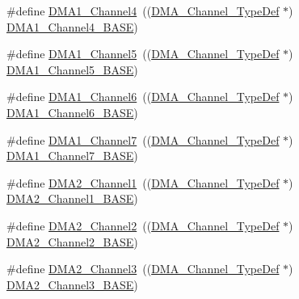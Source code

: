\begin{DoxyCompactItemize}
\item 
\#define \hyperlink{group___peripheral__declaration_gad2c42743316bf64da557130061b1f56a}{D\+M\+A1\+\_\+\+Channel4}~((\hyperlink{struct_d_m_a___channel___type_def}{D\+M\+A\+\_\+\+Channel\+\_\+\+Type\+Def} $\ast$) \hyperlink{openmotestm_2library_2inc_2stm32f10x__map_8h_a1adc93cd0baf0897202c71110e045692}{D\+M\+A1\+\_\+\+Channel4\+\_\+\+B\+A\+SE})
\item 
\#define \hyperlink{group___peripheral__declaration_ga06ff98ddef3c962795d2e2444004abff}{D\+M\+A1\+\_\+\+Channel5}~((\hyperlink{struct_d_m_a___channel___type_def}{D\+M\+A\+\_\+\+Channel\+\_\+\+Type\+Def} $\ast$) \hyperlink{openmotestm_2library_2inc_2stm32f10x__map_8h_ac041a71cd6c1973964f847a68aa14478}{D\+M\+A1\+\_\+\+Channel5\+\_\+\+B\+A\+SE})
\item 
\#define \hyperlink{group___peripheral__declaration_gac013c4376e4797831b5ddd2a09519df8}{D\+M\+A1\+\_\+\+Channel6}~((\hyperlink{struct_d_m_a___channel___type_def}{D\+M\+A\+\_\+\+Channel\+\_\+\+Type\+Def} $\ast$) \hyperlink{openmotestm_2library_2inc_2stm32f10x__map_8h_a896c2c7585dd8bc3969cf8561f689d2d}{D\+M\+A1\+\_\+\+Channel6\+\_\+\+B\+A\+SE})
\item 
\#define \hyperlink{group___peripheral__declaration_ga4f9c23b3d1add93ed206b5c9afa5cda3}{D\+M\+A1\+\_\+\+Channel7}~((\hyperlink{struct_d_m_a___channel___type_def}{D\+M\+A\+\_\+\+Channel\+\_\+\+Type\+Def} $\ast$) \hyperlink{openmotestm_2library_2inc_2stm32f10x__map_8h_aeee0d1f77d0db1db533016a09351166c}{D\+M\+A1\+\_\+\+Channel7\+\_\+\+B\+A\+SE})
\item 
\#define \hyperlink{group___peripheral__declaration_gad86c75e1ff89e03e15570f47962865c8}{D\+M\+A2\+\_\+\+Channel1}~((\hyperlink{struct_d_m_a___channel___type_def}{D\+M\+A\+\_\+\+Channel\+\_\+\+Type\+Def} $\ast$) \hyperlink{openmotestm_2library_2inc_2stm32f10x__map_8h_ad3bd6c4201d12f5d474518c1b02f8e3b}{D\+M\+A2\+\_\+\+Channel1\+\_\+\+B\+A\+SE})
\item 
\#define \hyperlink{group___peripheral__declaration_ga316024020799373b9d8e35c316c74f24}{D\+M\+A2\+\_\+\+Channel2}~((\hyperlink{struct_d_m_a___channel___type_def}{D\+M\+A\+\_\+\+Channel\+\_\+\+Type\+Def} $\ast$) \hyperlink{openmotestm_2library_2inc_2stm32f10x__map_8h_a22f39f23c879c699b88e04a629f69d1c}{D\+M\+A2\+\_\+\+Channel2\+\_\+\+B\+A\+SE})
\item 
\#define \hyperlink{group___peripheral__declaration_ga6dca52a79587e0ca9a5d669048b4c7eb}{D\+M\+A2\+\_\+\+Channel3}~((\hyperlink{struct_d_m_a___channel___type_def}{D\+M\+A\+\_\+\+Channel\+\_\+\+Type\+Def} $\ast$) \hyperlink{openmotestm_2library_2inc_2stm32f10x__map_8h_a6f2369b8bc155fb55a28891987605c2c}{D\+M\+A2\+\_\+\+Channel3\+\_\+\+B\+A\+SE})

\end{DoxyCompactItemize}
